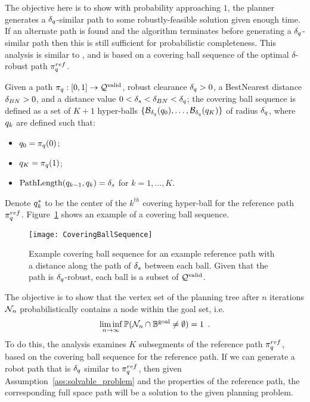 The objective here is to show with probability approaching $1$, the planner generates a $\delta_q$-similar path to some robustly-feasible solution given enough time.  If an alternate path is found and the algorithm terminates before generating a $\delta_q$-similar path then this is still sufficient for probabilistic completeness.  This analysis is similar to \cite{LiAOKP2016}, and is based on a covering ball sequence of the optimal  $\delta$-robust path $\pi_{q}^{ref}$.

\begin{definition}
    \label{def:coveringballseq}
    Given a path $\pi_{q} : [0, 1] \rightarrow \mathcal{Q}^{\textrm{valid}}$, robust clearance $\delta_q > 0$, a BestNearest distance $\delta_{BN} > 0$, and a distance value $0 < \delta_s < \delta_{BN} < \delta_q$; the covering ball sequence is defined as a set of $K + 1$ hyper-balls $\{ \mathcal{B}_{\delta_q}(q_0), \dots, \mathcal{B}_{\delta_q}(q_K) \}$ of radius $\delta_q$, where $q_k$ are defined such that:
    \begin{itemize}
        \item $q_0 = \pi_{q}(0)$;
        \item $q_K = \pi_{q}(1)$;
        \item $\textup{PathLength}(q_{k-1}, q_k) = \delta_s$ for $k = 1, \dots, K$.
    \end{itemize}
\end{definition}
\noindent
Denote $q^*_k$ to be the center of the $k^{th}$ covering hyper-ball for the reference path $\pi_{q}^{ref}$. Figure~\ref{fig:covering_ball_sequence} shows an example of a covering ball sequence.

\begin{figure}[h]
    \centering
    \texttt{[image: CoveringBallSequence]}
    \caption{Example covering ball sequence for an example reference path with a distance along the path of $\delta_s$ between each ball. Given that the path is $\delta_q$-robust, each ball is a subset of $\mathcal{Q}^{\textrm{valid}}$.}
    \label{fig:covering_ball_sequence}
\end{figure}

The objective is to show that the vertex set of the planning tree after $n$ iterations $\mathcal{N}_n$ probabilistically contains a node within the goal set, i.e.
\begin{equation}
    \liminf_{n \rightarrow \infty} \mathbb{P}( \mathcal{N}_n \cap \mathbb{B}^\textrm{goal} \neq \emptyset ) = 1 \enspace .
\end{equation}
To do this, the analysis examines $K$ subsegments of the reference path $\pi_{q}^{ref}$, based on the covering ball sequence for the reference path. If we can generate a robot path that is $\delta_q$ similar to $\pi_{q}^{ref}$, then given Assumption~\ref{ass:solvable_problem} and the properties of the reference path, the corresponding full space path will be a solution to the given planning problem.

